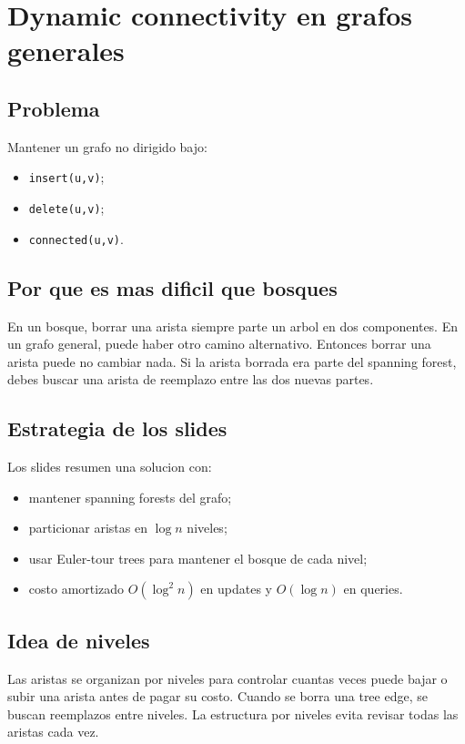 \documentclass[10pt]{article}
\newcommand{\bigO}{O}
\begin{document}
\newpage
\section{Dynamic connectivity en grafos generales}

\subsection{Problema}
Mantener un grafo no dirigido bajo:
\begin{itemize}[leftmargin=*]
\item \texttt{insert(u,v)};
\item \texttt{delete(u,v)};
\item \texttt{connected(u,v)}.
\end{itemize}

\subsection{Por que es mas dificil que bosques}
En un bosque, borrar una arista siempre parte un arbol en dos componentes. En un
grafo general, puede haber otro camino alternativo. Entonces borrar una arista
puede no cambiar nada. Si la arista borrada era parte del spanning forest, debes
buscar una arista de reemplazo entre las dos nuevas partes.

\subsection{Estrategia de los slides}
Los slides resumen una solucion con:
\begin{itemize}[leftmargin=*]
\item mantener spanning forests del grafo;
\item particionar aristas en $\log n$ niveles;
\item usar Euler-tour trees para mantener el bosque de cada nivel;
\item costo amortizado $\bigO(\log^2 n)$ en updates y $\bigO(\log n)$ en queries.
\end{itemize}

\subsection{Idea de niveles}
Las aristas se organizan por niveles para controlar cuantas veces puede bajar o
subir una arista antes de pagar su costo. Cuando se borra una tree edge, se
buscan reemplazos entre niveles. La estructura por niveles evita revisar todas
las aristas cada vez.
\end{document}

